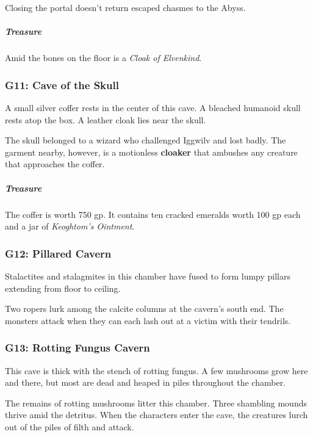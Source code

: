 \documentclass[10pt,a4paper,twoside,bg=print,twocolumn,openany,nodeprecatedcode]{dndbook}
\begin{document}
Closing the portal doesn't return escaped chasmes to the Abyss.

\subparagraph{Treasure}
Amid the bones on the floor is a \textit{Cloak of Elvenkind}.

\subsubsection{G11: Cave of the Skull}
\begin{DndReadAloud}{}
A small silver coffer rests in the center of this cave. A bleached humanoid skull rests atop the box. A leather cloak lies near the skull.

\end{DndReadAloud}

The skull belonged to a wizard who challenged Iggwilv and lost badly. The garment nearby, however, is a motionless \textbf{cloaker} that ambushes any creature that approaches the coffer.

\subparagraph{Treasure}
The coffer is worth 750 gp. It contains ten cracked emeralds worth 100 gp each and a jar of \textit{Keoghtom's Ointment}.

\subsubsection{G12: Pillared Cavern}
\begin{DndReadAloud}{}
Stalactites and stalagmites in this chamber have fused to form lumpy pillars extending from floor to ceiling.

\end{DndReadAloud}

Two ropers lurk among the calcite columns at the cavern's south end. The monsters attack when they can each lash out at a victim with their tendrils.

\subsubsection{G13: Rotting Fungus Cavern}
\begin{DndReadAloud}{}
This cave is thick with the stench of rotting fungus. A few mushrooms grow here and there, but most are dead and heaped in piles throughout the chamber.

\end{DndReadAloud}

The remains of rotting mushrooms litter this chamber. Three shambling mounds thrive amid the detritus. When the characters enter the cave, the creatures lurch out of the piles of filth and attack.
\end{document}
